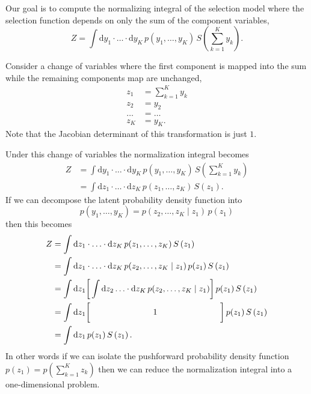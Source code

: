 \documentclass[
  letterpaper,
  DIV=11,
  numbers=noendperiod]{scrartcl}
\begin{document}
Our goal is to compute the normalizing integral of the selection model
where the selection function depends on only the sum of the component
variables, \[
Z
=
\int \mathrm{d} y_{1} \cdot \ldots \cdot \mathrm{d} y_{K} \,
p(y_{1}, \ldots, y_{K}) \, S \left( \sum_{k = 1}^{K} y_{k} \right).
\]

Consider a change of variables where the first component is mapped into
the sum while the remaining components map are unchanged, \begin{align*}
z_{1} &= \sum_{k = 1}^{K} y_{k}
\\
z_{2} &= y_{2}
\\
\ldots &= \ldots
\\
z_{K} &= y_{K}.
\end{align*} Note that the Jacobian determinant of this transformation
is just \(1\).

Under this change of variables the normalization integral becomes
\begin{align*}
Z
&=
\int \mathrm{d} y_{1} \cdot \ldots \cdot \mathrm{d} y_{K} \,
p(y_{1}, \ldots, y_{K}) \, S \left( \sum_{k = 1}^{K} y_{k} \right)
\\
&=
\int \mathrm{d} z_{1} \cdot \ldots \cdot \mathrm{d} z_{K} \,
p(z_{1}, \ldots, z_{K}) \, S \left( z_{1} \right).
\end{align*} If we can decompose the latent probability density function
into \[
p(y_{1}, \ldots, y_{K}) = p(z_{2}, \ldots, z_{K} \mid z_{1}) \, p(z_{1})
\] then this becomes \begin{align*}
Z
&=
\int \mathrm{d} z_{1} \cdot \ldots \cdot \mathrm{d} z_{K} \,
p(z_{1}, \ldots, z_{K}) \, S \left( z_{1} \right)
\\
&=
\int \mathrm{d} z_{1} \cdot \ldots \cdot \mathrm{d} z_{K} \,
p(z_{2}, \ldots, z_{K} \mid z_{1}) \, p(z_{1}) \, S \left( z_{1} \right)
\\
&=
\int \mathrm{d} z_{1}
\bigg[ \int \mathrm{d} z_{2} \ldots \cdot \mathrm{d} z_{K} \,
p(z_{2}, \ldots, z_{K} \mid z_{1}) \bigg] \,
p(z_{1}) \, S \left( z_{1} \right)
\\
&=
\int \mathrm{d} z_{1}
\bigg[ \hspace{26.25mm} 1 \hspace{26.25mm} \bigg] \,
p(z_{1}) \, S \left( z_{1} \right)
\\
&=
\int \mathrm{d} z_{1} \, p(z_{1}) \, S \left( z_{1} \right).
\end{align*} In other words if we can isolate the pushforward
probability density function
\(p( z_{1} ) = p \left( \sum_{k = 1}^{K} z_{k} \right)\) then we can
reduce the normalization integral into a one-dimensional problem.
\end{document}
